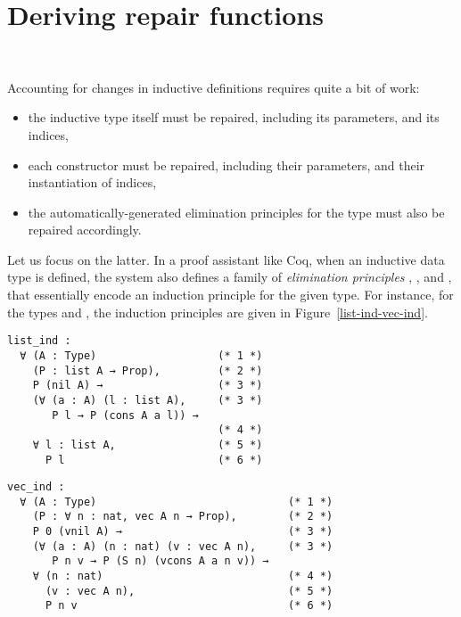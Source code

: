 \section{Deriving repair functions}~\label{deriving}

Accounting for changes in inductive definitions requires quite a bit of work:

\begin{itemize}

\item the inductive type itself must be repaired, including its parameters, and
its indices,

\item each constructor must be repaired, including their parameters, and their
instantiation of indices,

\item the automatically-generated elimination principles for the type must also
be repaired accordingly.

\end{itemize}%
%
Let us focus on the latter.  In a proof assistant like Coq, when an inductive
data type  is defined, the system also defines a family of
\textit{elimination principles} , , and
, that essentially encode an induction principle for the given
type.  For instance, for the types  and , the
induction principles are given in Figure~\ref{list-ind-vec-ind}.

\begin{figure*}[!htp]

  \noindent%
  \begin{minipage}[t]{0.45\textwidth}
\begin{verbatim}
list_ind :
  ∀ (A : Type)                   (* 1 *)
    (P : list A → Prop),         (* 2 *)
    P (nil A) →                  (* 3 *)
    (∀ (a : A) (l : list A),     (* 3 *)
       P l → P (cons A a l)) →
                                 (* 4 *)
    ∀ l : list A,                (* 5 *)
      P l                        (* 6 *)
\end{verbatim}
  \end{minipage}%
  \begin{minipage}[t]{0.55\textwidth}
\begin{verbatim}
vec_ind :
  ∀ (A : Type)                              (* 1 *)
    (P : ∀ n : nat, vec A n → Prop),        (* 2 *)
    P 0 (vnil A) →                          (* 3 *)
    (∀ (a : A) (n : nat) (v : vec A n),     (* 3 *)
       P n v → P (S n) (vcons A a n v)) →
    ∀ (n : nat)                             (* 4 *)
      (v : vec A n),                        (* 5 *)
      P n v                                 (* 6 *)
\end{verbatim}
  \end{minipage}

  \caption{ Induction principles for  and .
 can compute a term diff transforming the former
into the latter, given the diff turning the  inductive data type
declaration into the  one.}~\label{list-ind-vec-ind}
\end{figure*}


